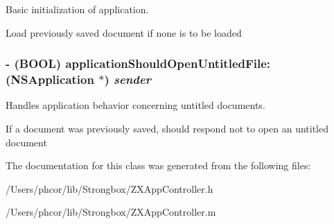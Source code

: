 Basic initialization of application. 

Load previously saved document if none is to be loaded \hypertarget{interface_z_x_app_controller_6ced841705b02c4f5b6866dd381edc8e}{
\subsubsection[{applicationShouldOpenUntitledFile:}]{\setlength{\rightskip}{0pt plus 5cm}- (BOOL) applicationShouldOpenUntitledFile: (NSApplication $\ast$) {\em sender}}}
\label{interface_z_x_app_controller_6ced841705b02c4f5b6866dd381edc8e}


Handles application behavior concerning untitled documents. 

If a document was previously saved, should respond not to open an untitled document 

The documentation for this class was generated from the following files:\begin{CompactItemize}
\item 
/Users/phcor/lib/Strongbox/ZXAppController.h\item 
/Users/phcor/lib/Strongbox/ZXAppController.m\end{CompactItemize}
